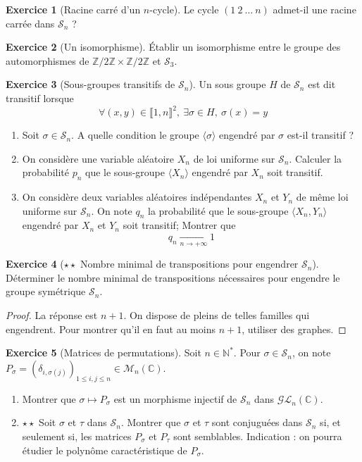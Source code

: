\documentclass[french]{book}
\newcommand{\N}{\mathbb{N}}
\newcommand{\Z}{\mathbb{Z}}
\newcommand{\C}{\mathbb{C}}
\newcommand{\st}{^*}
\theoremstyle{definition}
\newtheorem{ex}{Exercice}[chapter]
\theoremstyle{theorem}
\theoremstyle{remark}
\begin{document}
\begin{ex}[Racine carré d'un $n$-cycle]
	Le cycle $(1\ 2\ \ldots\ n)$ admet-il une racine carrée dans $\mathcal{S}_n$ ?
\end{ex}

\begin{ex}[Un isomorphisme]
	Établir un isomorphisme entre le groupe des automorphismes de $\Z/2\Z\times\Z/2\Z$ et $\mathcal{S}_3$.
\end{ex}

\begin{ex}[Sous-groupes transitifs de $\mathcal{S}_n$]
	Un sous groupe $H$ de $\mathcal{S}_n$ est dit transitif lorsque $$\forall (x,y)\in\llbracket1,n\rrbracket^2,\ \exists\sigma\in H,\ \sigma(x)=y$$
	\begin{enumerate}
		\item Soit $\sigma\in\mathcal{S}_n$. A quelle condition le groupe $\langle\sigma\rangle$ engendré par $\sigma$ est-il transitif ?
		\item On considère une variable aléatoire $X_n$ de loi uniforme sur $\mathcal{S}_n$. Calculer la probabilité $p_n$ que le sous-groupe $\langle X_n\rangle$ engendré par $X_n$ soit transitif.
		\item On considère deux variables aléatoires indépendantes $X_n$ et $Y_n$ de même loi uniforme sur $\mathcal{S}_n$. On note $q_n$ la probabilité que le sous-groupe $\langle X_n,Y_n\rangle$ engendré par $X_n$ et $Y_n$ soit transitif; Montrer que $$q_n\xrightarrow[n\to+\infty]{}1$$
	\end{enumerate}
\end{ex}

\begin{ex}[$\star\star$ Nombre minimal de transpositions pour engendrer $\mathcal{S}_n$]
	Déterminer le nombre minimal de transpositions nécessaires pour engendre le groupe symétrique $\mathcal{S}_n$.
\end{ex}

\begin{proof}
	La réponse est $n+1$. On dispose de pleins de telles familles qui engendrent. Pour montrer qu'il en faut au moins $n+1$, utiliser des graphes.
\end{proof}

\begin{ex}[Matrices de permutations]
	Soit $n\in\N\st$. Pour $\sigma\in\mathcal{S}_n$, on note $P_\sigma=(\delta_{i,\sigma(j)})_{1\leqslant i,j\leqslant n}\in\mathcal{M}_n(\C)$.
	\begin{enumerate}
		\item Montrer que $\sigma\mapsto P_\sigma$ est un morphisme injectif de $\mathcal{S}_n$ dans $\mathcal{GL}_n(\C)$.
		\item $\star\star$ Soit $\sigma$ et $\tau$ dans $\mathcal{S}_n$. Montrer que $\sigma$ et $\tau$ sont conjuguées dans $\mathcal{S}_n$ si, et seulement si, les matrices $P_\sigma$ et $P_\tau$ sont semblables. Indication : on pourra étudier le polynôme caractéristique de $P_\sigma$.
	\end{enumerate}
\end{ex}
\end{document}
